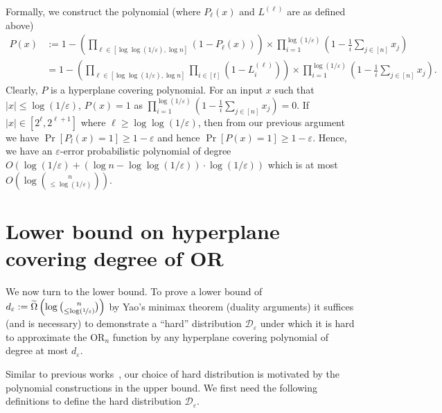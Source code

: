 \documentclass[10pt,a4paper]{article}
\theoremstyle{plain}
\theoremstyle{definition}
\renewcommand{\epsilon}{\varepsilon}
\newcommand{\eps}{\epsilon}
\newcommand{\OR}{\mathrm{OR}}
\newcommand{\calD}{{\mathcal{D}}}
\newcommand{\cbra}[1]{\left(#1\right)}
\newcommand{\lepsinv}{\log(\nicefrac1\eps)}
\newcommand{\Omegatilde}[1]{\widetilde\Omega \cbra{#1}}
\begin{document}
Formally, we construct the polynomial (where $P_\ell(x)$ and $L^{(\ell)}$ are as defined above)
\begin{align*}
    P(x) &:= 1- \cbra{\prod_{\ell \in [\log\log(1/\eps),\log n]}\cbra{1-P_\ell(x)}}\times \prod_{i =1}^{\log(1/\eps)} \left(1- \frac1i\sum_{j \in [n]} x_j\right) \\
    &= 1 - \cbra{\prod_{\ell \in [\log\log(1/\eps),\log n]}\prod_{i \in [t]} \cbra{1- L^{(\ell)}_i}}\times \prod_{i =1}^{\log(1/\eps)} \left(1- \frac1i\sum_{j \in [n]} x_j\right).
\end{align*}
Clearly, $P$ is a hyperplane covering polynomial. For an input $x$ such that $|x|\leq \log(1/\eps)$, $P(x)=1$ as $\prod_{i =1}^{\log(1/\eps)} \left(1- \frac1i\sum_{j \in [n]} x_j\right)=0$. If $|x|\in [2^\ell, 2^{\ell+1}]$ where $\ell\geq \log\log(1/\eps)$, then from our previous argument we have $\Pr[P_l(x)=1]\geq 1-\eps$ and hence $\Pr[P(x)=1]\geq 1- \eps$.
Hence, we have an $\eps$-error probabilistic polynomial of degree $O(\log (1/\eps) + (\log n - \log \log
(1/\eps))\cdot \log(1/\eps))$ which is at most $O(\log \binom{n}{\leq\log(1/\eps)})$.

\section{Lower bound on hyperplane covering degree of OR}
    We now turn to the lower bound. 
    To prove a lower bound of $d_\eps := \Omegatilde{\log \binom{n}{\leq \lepsinv}}$  
    by Yao's minimax theorem (duality arguments) it suffices (and is necessary) to
    demonstrate a ``hard'' distribution $\calD_{\eps}$ under which it is
    hard to approximate the $\OR_n$ function by any hyperplane covering
    polynomial of degree at most $d_\eps$. 

    Similar to previous
    works~\cite{MekaNV2016,HarshaS2019-ac0}, our choice of hard distribution is
    motivated by the polynomial constructions in the upper bound. We
    first need the following definitions to define the
    hard distribution $\calD_\eps$.
\end{document}
